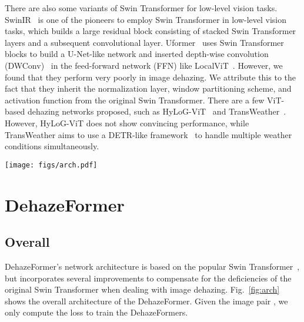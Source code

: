\documentclass[journal]{IEEEtran}
\begin{document}
There are also some variants of Swin Transformer for low-level vision tasks.
SwinIR~\cite{liang2021swinir} is one of the pioneers to employ Swin Transformer in low-level vision tasks, which builds a large residual block consisting of stacked Swin Transformer layers and a subsequent convolutional layer.
Uformer~\cite{wang2022uformer} uses Swin Transformer blocks to build a U-Net-like network and inserted depth-wise convolution (DWConv)~\cite{chollet2017xception} in the feed-forward network (FFN) like LocalViT~\cite{li2021localvit}.
However, we found that they perform very poorly in image dehazing.
We attribute this to the fact that they inherit the normalization layer, window partitioning scheme, and activation function from the original Swin Transformer.
There are a few ViT-based dehazing networks proposed, such as HyLoG-ViT~\cite{zhao2021hybrid} and TransWeather~\cite{valanarasu2021transweather}.
However, HyLoG-ViT does not show convincing performance, while TransWeather aims to use a DETR-like framework~\cite{carion2020end} to handle multiple weather conditions simultaneously.
 \begin{figure*}[t]
    \centering
    \texttt{[image: figs/arch.pdf]}
    \caption{
        DehazeFormer is a modified 5-stage U-Net, whose convolutional blocks are replaced by our DehazeFormer blocks.
        The components illustrated with dashed boxes in the DehazeFormer block indicate they are optional.
        The SK fusion and soft reconstruction layers are proposed to replace the original concatenation fusion and global residual.
        The input size is , and the size of feature maps in each stage is shown below the DehazeFormer block.
    }
    \label{fig:arch}
\end{figure*}

\section{DehazeFormer}

\subsection{Overall}

DehazeFormer's network architecture is based on the popular Swin Transformer~\cite{liu2021swin}, but incorporates several improvements to compensate for the deficiencies of the original Swin Transformer when dealing with image dehazing.
Fig.~\ref{fig:arch} shows the overall architecture of the DehazeFormer.
Given the image pair , we only compute the  loss to train the DehazeFormers.
\end{document}
